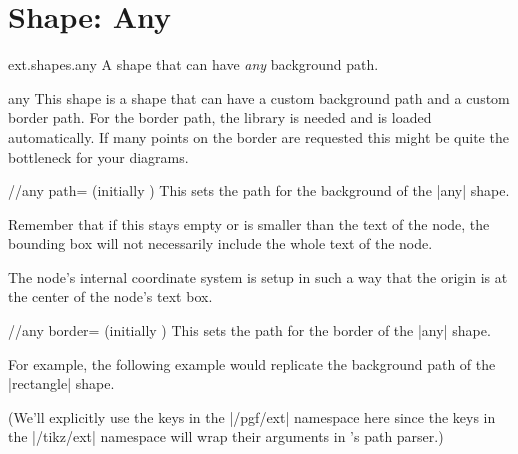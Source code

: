 %
%
%
\section{Shape: Any}
\begin{purepgflibrary}{ext.shapes.any}
  A shape that can have \emph{any} background path.
\end{purepgflibrary}
\begin{ext_shape}{any}
  This shape is a shape that can have a custom background path and a custom border path.
  For the border path, the  library is needed and is loaded automatically.
  If many points on the border are requested this might be quite the bottleneck for your diagrams.
  
  \begin{key}{/\pgfext/any path= (initially )}
    This sets the path for the background of the |any| shape.
    
    Remember that if this stays empty or is smaller than the text of the node,
    the bounding box will not necessarily include the whole text of the node.
    
    The node's internal coordinate system is setup in such a way
    that the origin is at the center of the node's text box.
  \end{key}
  \begin{key}{/\pgfext/any border= (initially )}
    This sets the path for the border of the |any| shape.

    For example, the following example would replicate the background path of the |rectangle| shape.
    
    {\small
      (We'll explicitly use the keys in the |/pgf/ext| namespace here
      since the keys in the |/tikz/ext| namespace will wrap their arguments in \tikzname's path parser.)\par}
\begin{codeexample}[preamble=\usepgflibrary{ext.shapes.any}]
\end{codeexample}


\end{key}
\end{ext_shape}

